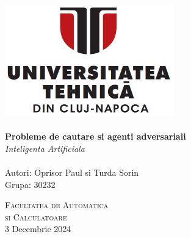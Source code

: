 \begin{titlepage}
\begin{center}

\includegraphics[width=0.55\textwidth]{resources/utcn_logo.jpg}~\\[2cm]

\HRule \\[0.4cm]
{ \LARGE
    \textbf{Probleme de cautare si agenti adversariali}\\[0.4cm]
    \emph{Inteligenta Artificiala}\\[0.4cm]
}
\HRule \\[1.5cm]

{ \large
    Autori: Oprisor Paul si Turda Sorin\\[0.1cm]
    Grupa: 30232\\[0.1cm]
}

\vfill
\textsc{\large Facultatea de Automatica\\si Calculatoare}\\[0.4cm]

{\large 3 Decembrie 2024}
    
\end{center}
\end{titlepage}